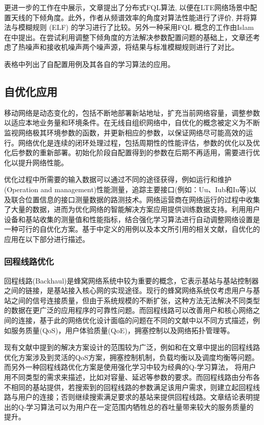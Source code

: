 ﻿\documentclass[11pt,draftclsnofoot,onecolumn,journal,letterpaper]{IEEEtran}
\begin{document}
更进一步的工作在\cite{Razavi2010a}中展示，文章提出了分布式FQL算法, 以便在LTE网络场景中配置天线的下倾角度。此外，作者从频谱效率的角度对算法性能进行了评价, 并将算法与模糊规则 (ELF) 的学习进行了比较。另外一种采用FQL 概念的工作由Islam 在\cite{Islam2012}中提出。在尝试利用调整下倾角度的方法解决参数配置问题的基础上，文章还考虑了热噪声和接收机噪声两个噪声源，将结果与标准模糊规则进行了对比。

表格中列出了自配置用例及其各自的学习算法的应用。


\subsection{自优化应用}
\label{sec:self-optimization}
移动网络是动态变化的，包括不断地部署新站地址，扩充当前网络容量，调整参数以适应本地业务量和环境条件。在无线自组织网络中，自优化的概念被定义为不断监视网络极其环境参数的函数，并更新相应的参数，以保证网络尽可能高效的运行\cite{Aliu2013}。网络优化是连续的闭环处理过程，包括周期性的性能评估，参数的优化以及优化后参数的重新部署。初始化阶段自配置得到的参数在后期不再适用，需要进行优化以提升网络性能。%

优化过程中所需要的输入数据可以通过不同的途径获得，例如运行和维护(Operation and management)性能测量，追踪主要接口(例如：Uu、Iub和Iu等)以及联合位置信息的接口测量数据的路测技术。网络运营商在网络运行的过程中收集了大量的数据，进而为优化网络的智能解决方案应用提供训练数据支持。利用用户设备和基站收集的测量值和性能指标，结合强化学习算法进行自动调整网络设置是一种可行的自优化方案。基于\cite{3gpp.36.902}中定义的用例以及本文所引用的相关文献，自优化的应用在以下部分进行描述。

\subsubsection{回程线路优化}

回程线路(Backhaul)是蜂窝网络系统中较为重要的概念，它表示基站与基站控制器之间的链接，是基站接入核心网的实现途径。现行的蜂窝网络系统仅考虑用户与基站之间的信号连接质量，但由于系统规模的不断扩张，这种方法无法解决不同类型的数据在更广泛的应用程序的可靠性问题。而回程线路可以改善用户和核心网络之间的连接，基于此的网络优化设计面临的问题在不同的文献中以不同方式描述，例如服务质量(QoS)，用户体验质量(QoE)，拥塞控制以及网络拓扑管理等。

现有文献中提到的解决方案设计的范围较为广泛，例如\cite{Wainio2016}和\cite{Chen2015}在文章中提出的回程线路优化方案涉及到灵活的QoS方案，拥塞控制机制，负载均衡以及调度均衡等问题。而另外一种回程线路优化方案是使用强化学习中较为经典的Q-学习算法，\cite{Jaber2015}\cite{Jaber2016a}\cite{Jaber2016c} 将用户用不同类型的需求来描述，比如对容量、延迟等参数的要求。而回程线路由分布各不相同的基站提供，若搜索到的回程线路的参数满足该用户需求，则建立起回程线路与用户的连接；否则继续搜索满足要求的基站来提供回程线路。文章结论表明提出的Q-学习算法可以为用户在一定范围内牺牲总的吞吐量带来较大的服务质量的提升。
\end{document}
